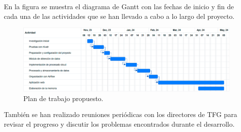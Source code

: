 \noindent En la figura  se muestra el diagrama de Gantt con las fechas de inicio y fin de cada una de las actividades que se han llevado a cabo a lo largo del proyecto.

\begin{figure}[h]
	\centering
	\includegraphics[width=1\textwidth]{Imagenes/Chapter_1/gant.png}
	\caption{Plan de trabajo propuesto.}
	\label{fig:gantt-diagram-es}
\end{figure}

\noindent También se han realizado reuniones periódicas con los directores de TFG para revisar el progreso y discutir los problemas encontrados durante el desarrollo.